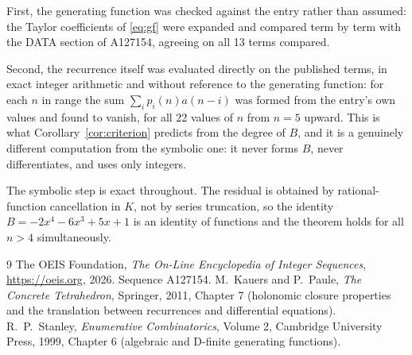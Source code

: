 \documentclass[11pt,a4paper]{article}
\theoremstyle{plain}
\theoremstyle{definition}
\begin{document}
First, the generating function was checked against the entry rather than assumed: the
Taylor coefficients of \eqref{eq:gf} were expanded and compared term by term with the DATA
section of A127154, agreeing on all 13 terms compared.

Second, the recurrence itself was evaluated directly on the published terms, in exact
integer arithmetic and without reference to the generating function: for each $n$ in range
the sum $\sum_{i}p_{i}(n)a(n-i)$ was formed from the entry's own values and found to
vanish, for all 22 values of $n$ from $n=5$ upward. This is what
Corollary~\ref{cor:criterion} predicts from the degree of $B$, and it is a genuinely
different computation from the symbolic one: it never forms $B$, never differentiates, and
uses only integers.

The symbolic step is exact throughout. The residual is obtained by rational-function
cancellation in $K$, not by series truncation, so the identity $B=- 2 x^{4} - 6 x^{3} + 5 x + 1$ is an
identity of functions and the theorem holds for all $n>4$ simultaneously.

\begin{thebibliography}{9}
 The OEIS Foundation, \emph{The On-Line Encyclopedia of Integer Sequences},
\url{https://oeis.org}, 2026. Sequence A127154.
 M.~Kauers and P.~Paule, \emph{The Concrete Tetrahedron}, Springer, 2011,
Chapter 7 (holonomic closure properties and the translation between recurrences and
differential equations).
 R.~P.~Stanley, \emph{Enumerative Combinatorics}, Volume 2, Cambridge
University Press, 1999, Chapter 6 (algebraic and D-finite generating functions).
\end{thebibliography}
\end{document}
